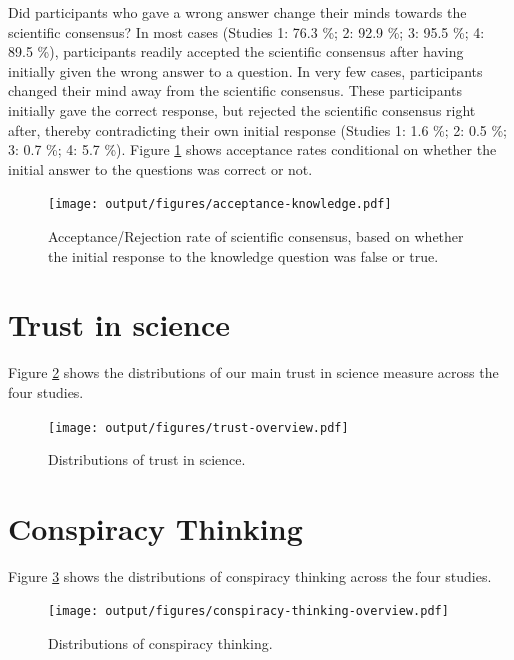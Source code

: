\documentclass[
  doc,floatsintext]{apa6}
\begin{document}
Did participants who gave a wrong answer change their minds towards the scientific consensus? In most cases (Studies 1: 76.3 \%; 2: 92.9 \%; 3: 95.5 \%; 4: 89.5 \%), participants readily accepted the scientific consensus after having initially given the wrong answer to a question. In very few cases, participants changed their mind away from the scientific consensus. These participants initially gave the correct response, but rejected the scientific consensus right after, thereby contradicting their own initial response (Studies 1: 1.6 \%; 2: 0.5 \%; 3: 0.7 \%; 4: 5.7 \%). Figure \ref{fig:acceptance-knowledge} shows acceptance rates conditional on whether the initial answer to the questions was correct or not.



\begin{figure}
\centering
\texttt{[image: output/figures/acceptance-knowledge.pdf]}
\caption{\label{fig:acceptance-knowledge}Acceptance/Rejection rate of scientific consensus, based on whether the initial response to the knowledge question was false or true.}
\end{figure}

\clearpage

\section{Trust in science}\label{trust}

Figure \ref{fig:trust-overview} shows the distributions of our main trust in science measure across the four studies.



\begin{figure}
\centering
\texttt{[image: output/figures/trust-overview.pdf]}
\caption{\label{fig:trust-overview}Distributions of trust in science.}
\end{figure}

\clearpage

\section{Conspiracy Thinking}\label{conspiracy-thinking}

Figure \ref{fig:conspiracy-thinking-overview} shows the distributions of conspiracy thinking across the four studies.



\begin{figure}
\centering
\texttt{[image: output/figures/conspiracy-thinking-overview.pdf]}
\caption{\label{fig:conspiracy-thinking-overview}Distributions of conspiracy thinking.}
\end{figure}
\end{document}

